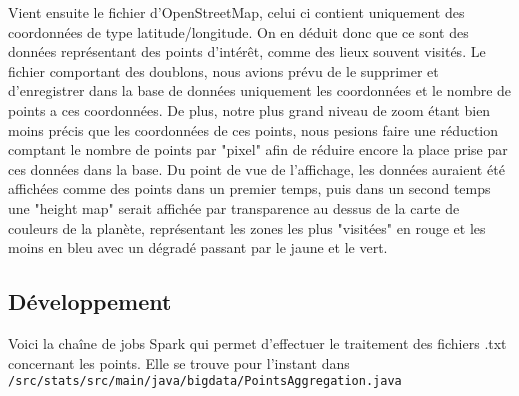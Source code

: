 \documentclass[a4paper]{article}
\begin{document}
	Vient ensuite le fichier d'OpenStreetMap, celui ci contient uniquement des coordonnées de type latitude/longitude. On en déduit donc que ce sont des données représentant des points d'intérêt, comme des lieux souvent visités. Le fichier comportant des doublons, nous avions prévu de le supprimer et d'enregistrer dans la base de données uniquement les coordonnées et le nombre de points a ces coordonnées. De plus, notre plus grand niveau de zoom étant bien moins précis que les coordonnées de ces points, nous pesions faire une réduction comptant le nombre de points par "pixel" afin de réduire encore la place prise par ces données dans la base.
Du point de vue de l'affichage, les données auraient été affichées comme des points dans un premier temps, puis dans un second temps une "height map" serait affichée par transparence au dessus de la carte de couleurs de la planète, représentant les zones les plus "visitées" en rouge et les moins en bleu avec un dégradé passant par le jaune et le vert.

\subsection{Développement}

Voici la chaîne de jobs Spark qui permet d'effectuer le traitement des fichiers .txt concernant les points.
Elle se trouve pour l'instant dans \texttt{/src/stats/src/main/java/bigdata/PointsAggregation.java}
	
\end{document}
